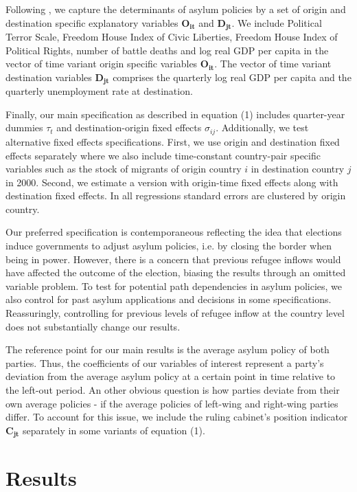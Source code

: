 \documentclass[a4paper,12pt]{article}
\begin{document}
Following \cite{hatton2016}, we capture the determinants of asylum policies by a set of origin and destination specific explanatory variables $\mathbf{O_{it}}$ and $\mathbf{D_{jt}}$. We include Political Terror Scale, Freedom House Index of Civic Liberties, Freedom House Index of  Political Rights, number of battle deaths and log real GDP per capita in the vector of time variant origin specific variables $\mathbf{O_{it}}$. The vector of time variant destination variables $\mathbf{D_{jt}}$ comprises the quarterly log real GDP per capita and the quarterly unemployment rate at destination. 
 
Finally, our main specification as described in equation (1) includes quarter-year dummies $\tau_t$ and destination-origin fixed effects $\sigma_{ij}$. Additionally, we test alternative fixed effects specifications. First, we use origin and destination fixed effects separately where we also include time-constant country-pair specific variables such as the stock of migrants of origin country $i$ in destination country $j$ in 2000. Second, we estimate a version with origin-time fixed effects along with destination fixed effects. In all regressions standard errors are clustered by origin country.

Our preferred specification is contemporaneous reflecting the idea that elections induce governments to adjust asylum policies, i.e. by closing the border when being in power. However, there is a concern that previous refugee inflows would have affected the outcome of the election, biasing the results through an omitted variable problem. To test for potential path dependencies in asylum policies, we also control for past asylum applications and decisions in some specifications. Reassuringly, controlling for previous levels of refugee inflow at the country level does not substantially change our results. 

The reference point for our main results is the average asylum policy of both parties. Thus, the coefficients of our variables of interest represent a party's deviation from the average asylum policy at a certain point in time relative to the left-out period. An other obvious question is how parties deviate from their own average policies - if the average policies of left-wing and right-wing parties differ. To account for this issue, we include the ruling cabinet's position indicator $\mathbf{C_{jt}}$ separately in some variants of equation (1).

\section{Results} \label{sec:results}
\end{document}
